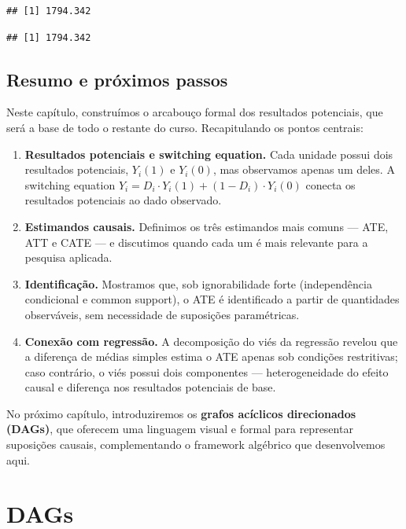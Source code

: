 \documentclass[
]{article}
\begin{document}
\begin{verbatim}
## [1] 1794.342
\end{verbatim}

\begin{verbatim}
## [1] 1794.342
\end{verbatim}

\subsection{Resumo e próximos passos}\label{resumo-e-pruxf3ximos-passos-1}

Neste capítulo, construímos o arcabouço formal dos resultados potenciais, que será a base de todo o restante do curso. Recapitulando os pontos centrais:

\begin{enumerate}
\def\labelenumi{\arabic{enumi}.}
\item
  \textbf{Resultados potenciais e switching equation.} Cada unidade possui dois resultados potenciais, \(Y_i(1)\) e \(Y_i(0)\), mas observamos apenas um deles. A switching equation \(Y_i = D_i \cdot Y_i(1) + (1-D_i) \cdot Y_i(0)\) conecta os resultados potenciais ao dado observado.
\item
  \textbf{Estimandos causais.} Definimos os três estimandos mais comuns --- ATE, ATT e CATE --- e discutimos quando cada um é mais relevante para a pesquisa aplicada.
\item
  \textbf{Identificação.} Mostramos que, sob ignorabilidade forte (independência condicional e common support), o ATE é identificado a partir de quantidades observáveis, sem necessidade de suposições paramétricas.
\item
  \textbf{Conexão com regressão.} A decomposição do viés da regressão revelou que a diferença de médias simples estima o ATE apenas sob condições restritivas; caso contrário, o viés possui dois componentes --- heterogeneidade do efeito causal e diferença nos resultados potenciais de base.
\end{enumerate}

No próximo capítulo, introduziremos os \textbf{grafos acíclicos direcionados (DAGs)}, que oferecem uma linguagem visual e formal para representar suposições causais, complementando o framework algébrico que desenvolvemos aqui.

\section{DAGs}\label{dags}
\end{document}
